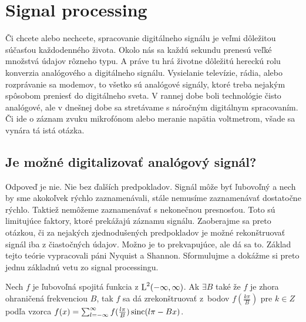 \section{Signal processing}
Či chcete alebo nechcete, spracovanie digitálneho signálu je veľmi dôležitou
súčasťou každodenného života. Okolo nás sa každú sekundu prenesú veľké
množstvá údajov rôzneho typu. A práve tu hrá životne dôležitú hereckú
rolu konverzia analógového a digitálneho signálu. Vysielanie
televízie, rádia, alebo rozprávanie sa modemov, to všetko sú analógové
signály, ktoré treba nejakým spôsobom preniesť do digitálneho sveta. V
rannej dobe boli technológie čisto analógové, ale v dnešnej dobe sa
stretávame s náročným digitálnym spracovaním. Či ide o záznam zvuku
mikrofónom alebo meranie napätia voltmetrom, všade sa vynára tá istá
otázka.

\subsection{Je možné digitalizovať analógový signál?}
Odpoveď je nie. Nie bez ďalších predpokladov. Signál môže byť
ľubovoľný a nech by sme akokoľvek rýchlo zaznamenávali, stále nemusíme
zaznamenávať dostatočne rýchlo. Taktiež nemôžeme zaznamenávať s
nekonečnou presnosťou. Toto sú limitujúce faktory, ktoré prekážajú
záznamu signálu. Zaoberajme sa preto otázkou, či za nejakých
zjednodušených predpokladov je možné rekonštruovať signál iba z
čiastočných údajov. Možno je to prekvapujúce, ale dá sa to. Základ
tejto teórie vypracovali páni Nyquist a Shannon. Sformulujme a dokážme
si preto jednu základnú vetu zo signal processingu.

\begin{veta}
    Nech $f$ je ľubovoľná spojitá funkcia z $\mbox{L}^2(-\infty,\infty)$. 
    Ak $\exists B$ také že $f$ je zhora ohraničená frekvenciou $B$,
    tak $f$ sa dá zrekonštruovať z~bodov $f(\frac{k\pi}{B})$ pre
    $k\in Z$ podľa vzorca 
    $f(x) = \sum_{l=-\infty}^{\infty}
                f(\frac{l \pi}{B})  \operatorname{sinc}(l \pi - B x)$.
\end{veta}

